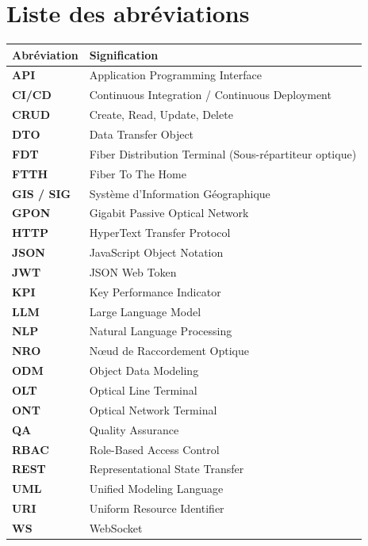 \chapter*{Liste des abr\'eviations}

\begin{table}[H]
\centering
\begin{tabularx}{\textwidth}{lX}
\toprule
\textbf{Abr\'eviation} & \textbf{Signification} \\
\midrule
\textbf{API}   & Application Programming Interface \\
\textbf{CI/CD} & Continuous Integration / Continuous Deployment \\
\textbf{CRUD}  & Create, Read, Update, Delete \\
\textbf{DTO}   & Data Transfer Object \\
\textbf{FDT}   & Fiber Distribution Terminal (Sous-r\'epartiteur optique) \\
\textbf{FTTH}  & Fiber To The Home \\
\textbf{GIS / SIG} & Syst\`eme d'Information G\'eographique \\
\textbf{GPON}  & Gigabit Passive Optical Network \\
\textbf{HTTP}  & HyperText Transfer Protocol \\
\textbf{JSON}  & JavaScript Object Notation \\
\textbf{JWT}   & JSON Web Token \\
\textbf{KPI}   & Key Performance Indicator \\
\textbf{LLM}   & Large Language Model \\
\textbf{NLP}   & Natural Language Processing \\
\textbf{NRO}   & N\oe ud de Raccordement Optique \\
\textbf{ODM}   & Object Data Modeling \\
\textbf{OLT}   & Optical Line Terminal \\
\textbf{ONT}   & Optical Network Terminal \\
\textbf{QA}    & Quality Assurance \\
\textbf{RBAC}  & Role-Based Access Control \\
\textbf{REST}  & Representational State Transfer \\
\textbf{UML}   & Unified Modeling Language \\
\textbf{URI}   & Uniform Resource Identifier \\
\textbf{WS}    & WebSocket \\
\bottomrule
\end{tabularx}
\end{table}
